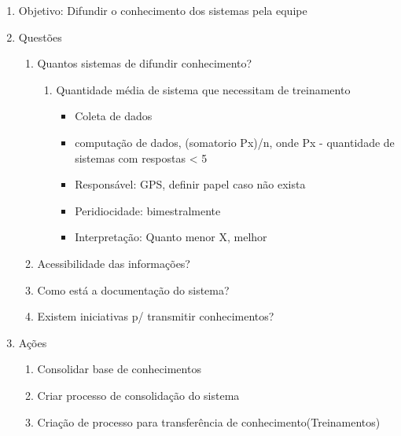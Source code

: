 \documentclass{article}
\begin{document}
	\begin{enumerate}
	\item Objetivo: Difundir o conhecimento dos sistemas pela equipe
	\item Questões
		\begin{enumerate}
		\item Quantos sistemas de difundir conhecimento?
			\begin{enumerate}
			\item Quantidade média de sistema que necessitam de treinamento
				\begin{itemize}
				\item Coleta de dados
				\item computação de dados, (somatorio Px)/n, onde Px - quantidade de sistemas com respostas < 5
				\item Responsável: GPS, definir papel caso não exista
				\item Peridiocidade: bimestralmente
				\item Interpretação: Quanto menor X, melhor
				\end{itemize}
			\end{enumerate}
		\item Acessibilidade das informações?
		\item Como está a documentação do sistema?
		\item Existem iniciativas p/ transmitir conhecimentos?		
		\end{enumerate}
	\item Ações
		\begin{enumerate}
		\item Consolidar base de conhecimentos
		\item Criar processo de consolidação do sistema
		\item Criação de processo para transferência de conhecimento(Treinamentos)
		\end{enumerate}
	\end{enumerate}
	
\end{document}
